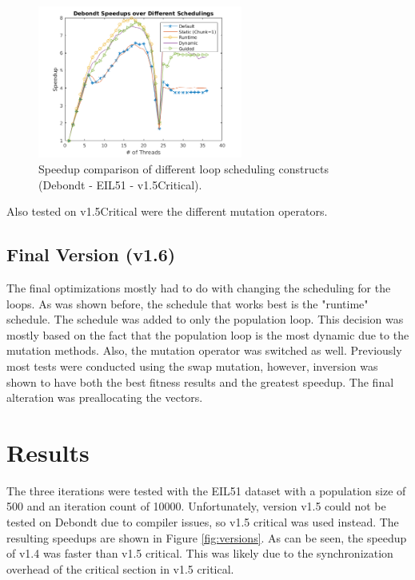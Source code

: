 \documentclass[10pt,letterpaper]{article}
\begin{document}
\begin{figure}
\centering
\includegraphics[width=0.6\textwidth]{../img/debondt_schedulers.png} 
\caption{Speedup comparison of different loop scheduling constructs (Debondt - EIL51 - v1.5Critical).}
\label{fig:schedules}
\end{figure}

Also tested on v1.5Critical were the different mutation operators. 


\subsection{Final Version (v1.6)} 
The final optimizations mostly had to do with changing the scheduling for the loops. As was shown before, the schedule that works best is the "runtime" schedule. The schedule was added to only the population loop. This decision was mostly based on the fact that the population loop is the most dynamic due to the mutation methods. Also, the mutation operator was switched as well. Previously most tests were conducted using the swap mutation, however, inversion was shown to have both the best fitness results and the greatest speedup. The final alteration was preallocating the vectors.

\section{Results} \label{sec:results}
The three iterations were tested with the EIL51 dataset with a population size of 500 and an iteration count of 10000. Unfortunately, version v1.5 could not be tested on Debondt due to compiler issues, so v1.5 critical was used instead. The resulting speedups are shown in Figure \ref{fig:versions}. As can be seen, the speedup of v1.4 was faster than v1.5 critical. This was likely due to the synchronization overhead of the critical section in v1.5 critical.
\end{document}
